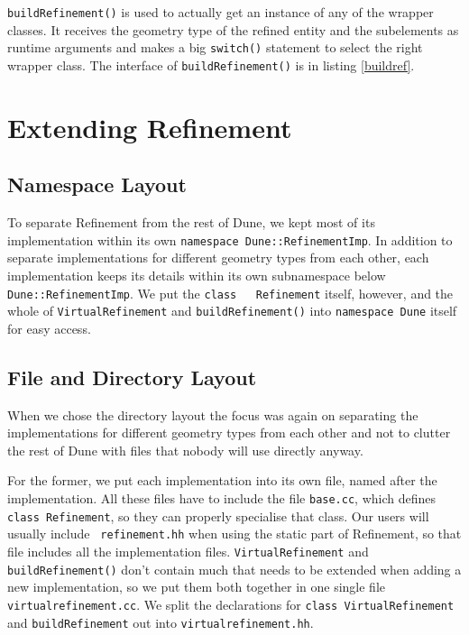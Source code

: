 \documentclass[english,a4paper]{article}
\newcommand{\code}[1]{\textnormal{\lstinline{#1}}}
\begin{document}
\code{buildRefinement()} is used to actually get an instance of
any of the wrapper classes.  It receives the geometry type of the
refined entity and the subelements as runtime arguments and makes a
big \code{switch()} statement to select the right wrapper class.
The interface of \code{buildRefinement()} is in listing
\ref{buildref}.

\section{Extending Refinement}

\subsection{Namespace Layout}

To separate Refinement from the rest of Dune, we kept most of its
implementation within its own \code{namespace Dune::RefinementImp}.
In addition to separate implementations for different geometry types
from each other, each implementation keeps its details within its own
subnamespace below \code{Dune::RefinementImp}.  We put the \code{class
  Refinement} itself, however, and the whole of
\code{VirtualRefinement} and \code{buildRefinement()} into
\code{namespace Dune} itself for easy access.

\subsection{File and Directory Layout}

When we chose the directory layout the focus was again on separating
the implementations for different geometry types from each other and
not to clutter the rest of Dune with files that nobody will use
directly anyway.

For the former, we put each implementation into its own file, named
after the implementation.  All these files have to include the file
{\tt base.cc}, which defines \code{class Refinement}, so they can
properly specialise that class.  Our users will usually include {\tt
  refinement.hh} when using the static part of Refinement, so that
file includes all the implementation files.  \code{VirtualRefinement}
and \code{buildRefinement()} don't contain much that needs to be
extended when adding a new implementation, so we put them both
together in one single file {\tt virtualrefinement.cc}.  We split the
declarations for \code{class VirtualRefinement} and
\code{buildRefinement} out into {\tt virtualrefinement.hh}.
\end{document}
